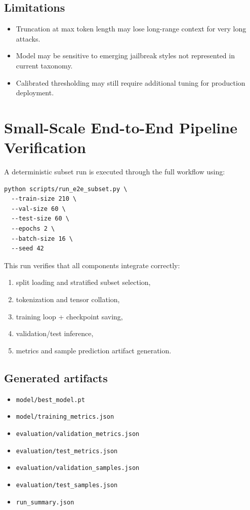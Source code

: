 \documentclass[11pt]{article}
\begin{document}
\subsection{Limitations}
\begin{itemize}[leftmargin=*]
\item Truncation at max token length may lose long-range context for very long attacks.
\item Model may be sensitive to emerging jailbreak styles not represented in current taxonomy.
\item Calibrated thresholding may still require additional tuning for production deployment.
\end{itemize}

\section{Small-Scale End-to-End Pipeline Verification}
A deterministic subset run is executed through the full workflow using:
\begin{verbatim}
python scripts/run_e2e_subset.py \
  --train-size 210 \
  --val-size 60 \
  --test-size 60 \
  --epochs 2 \
  --batch-size 16 \
  --seed 42
\end{verbatim}

This run verifies that all components integrate correctly:
\begin{enumerate}[leftmargin=*]
\item split loading and stratified subset selection,
\item tokenization and tensor collation,
\item training loop + checkpoint saving,
\item validation/test inference,
\item metrics and sample prediction artifact generation.
\end{enumerate}

\subsection{Generated artifacts}
\begin{itemize}[leftmargin=*]
\item \texttt{model/best\_model.pt}
\item \texttt{model/training\_metrics.json}
\item \texttt{evaluation/validation\_metrics.json}
\item \texttt{evaluation/test\_metrics.json}
\item \texttt{evaluation/validation\_samples.json}
\item \texttt{evaluation/test\_samples.json}
\item \texttt{run\_summary.json}
\end{itemize}
\end{document}
